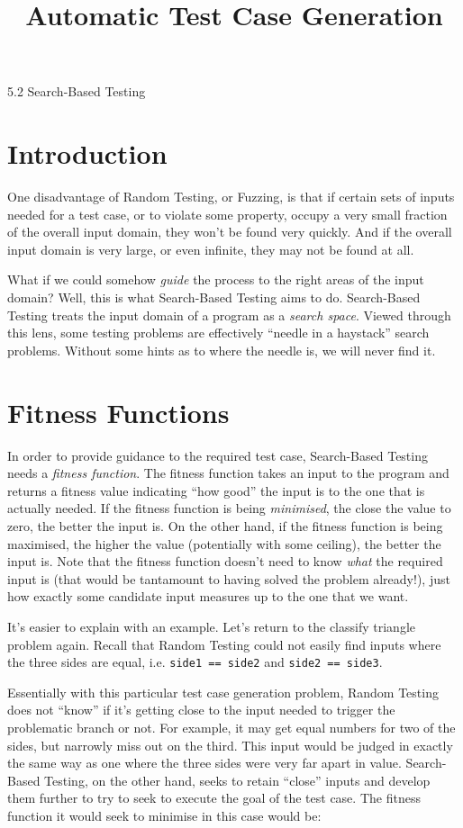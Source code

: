 



\title{Automatic Test Case Generation}{5.2 Search-Based Testing}

\section{Introduction}

One disadvantage of Random Testing, or Fuzzing, is that if certain sets of
inputs needed for a test case, or to violate some property, occupy a very small
fraction of the overall input domain, they won't be found very quickly. And if
the overall input domain is very large, or even infinite, they may not be found
at all.

What if we could somehow {\it guide} the process to the right areas of the input
domain? Well, this is what Search-Based Testing aims to do. Search-Based Testing
treats the input domain of a program as a {\it search space}. Viewed through
this lens, some testing problems are effectively ``needle in a haystack'' search
problems. Without some hints as to where the needle is, we will never find it.

\section{Fitness Functions}
In order to provide guidance to the required test case, Search-Based Testing
needs a {\it fitness function}. The fitness function takes an input to the
program and returns a {fitness value} indicating ``how good'' the input is to
the one that is actually needed. If the fitness function is being {\it
minimised}, the close the value to zero, the better the input is. On the other
hand, if the fitness function is being maximised, the higher the value
(potentially with some ceiling), the better the input is.
%
Note that the fitness function doesn't need to know {\it what} the required
input is (that would be tantamount to having solved the problem already!), just
how exactly some candidate input measures up to the one that we want.

It's easier to explain with an example. Let's return to the classify triangle
problem again. Recall that Random Testing could not easily find inputs where the
three sides are equal, i.e. {\tt side1 == side2} and {\tt side2 == side3}.

Essentially with this particular test case generation problem, Random Testing
does not ``know'' if it's getting close to the input needed to trigger the
problematic branch or not. For example, it may get equal numbers for two of the
sides, but narrowly miss out on the third. This input would be judged in exactly
the same way as one where the three sides were very far apart in value.
Search-Based Testing, on the other hand, seeks to retain ``close'' inputs and
develop them further to try to seek to execute the goal of the test case. The
fitness function it would seek to minimise in this case would be:

